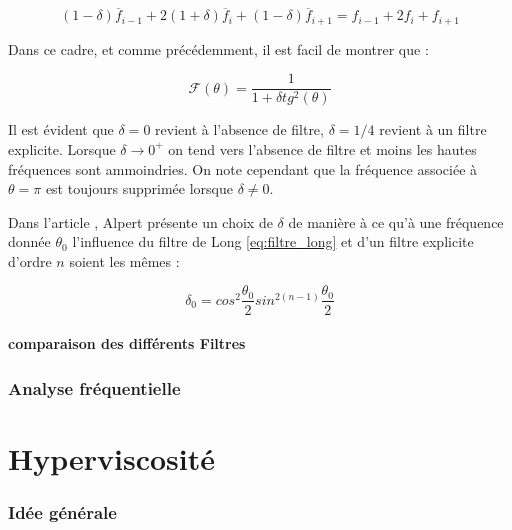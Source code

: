\documentclass[10pt,a4paper]{amsart}
\begin{document}
\begin{equation}
  \label{eq:filtre_long}
  (1-\delta) \overline{f}_{i-1} + 2 ( 1+ \delta ) \overline{f}_i + (1- \delta) \overline{f}_{i+1} = f_{i-1} + 2 f_i + f_{i+1}
\end{equation}

Dans ce cadre, et comme précédemment, il est facil de montrer que :

\begin{equation}
  \label{eq:freq_long}
  \mathcal{F}(\theta) = \dfrac{1}{1 + \delta tg^{2} ( \theta )}
\end{equation}

Il est évident que $\delta = 0$ revient à l'absence de filtre, $\delta = 1/4$ revient à un filtre explicite. Lorsque $\delta \rightarrow 0^+ $ on tend vers l'absence de filtre et moins les hautes fréquences sont ammoindries. On note cependant que la fréquence associée à $\theta = \pi$ est toujours supprimée lorsque $\delta \neq 0$.

Dans l'article \cite{Alpert1981}, Alpert présente un choix de $\delta$ de manière à ce qu'à une fréquence donnée $\theta_0$ l'influence du filtre de Long \eqref{eq:filtre_long} et d'un filtre explicite d'ordre $n$ soient les m\^emes :

\begin{equation}
  \delta_0 = cos^2 \frac{\theta_0}{2} sin^{2(n-1)} \frac{\theta_0}{2}
\end{equation}

\subsection{comparaison des différents Filtres}





\section{Analyse fréquentielle}



%
%

\part{Hyperviscosité}

\section{Idée générale}
\end{document}
